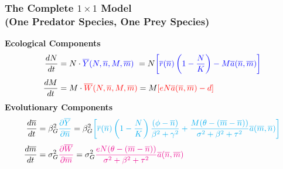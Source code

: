 \documentclass[10pt]{beamer}
\begin{document}
\begin{frame}
	\frametitle{The Complete $1\times1$ Model \\ (One Predator Species, One Prey Species)}
	{\bf Ecological Components}
	\begin{align*}
		\frac{dN}{dt} &= N\cdot {\color{blue}\overline{Y}(N, \overline{n}, M, \overline{m})}\ = N{\color{blue}\left[\overline{r}(\overline{n})\left(1 - \frac{N}{K}\right) - M\overline{a}(\overline{n}, \overline{m})\right]}\\[.1cm]
		\frac{dM}{dt} &= M\cdot {\color{red}\overline{W}(N, \overline{n}, M, \overline{m})} = M{\color{red}\left[eN\overline{a}(\overline{n}, \overline{m}) - d\right]}
	\end{align*}
	{\bf Evolutionary Components}
	\begin{align*}
		\frac{d\overline{n}}{dt} &= \beta_G^2{\color{cyan}\frac{\partial \overline{Y}}{\partial \overline{n}}} = \beta_G^2{\color{cyan}\left[\overline{r}(\overline{n})\left(1 - \frac{N}{K}\right)\frac{(\phi - \overline{n})}{\beta^2 + \gamma^2} + \frac{M(\theta - (\overline{m} - \overline{n}))}{\sigma^2 + \beta^2 + \tau^2} \overline{a}(\overline{m}, \overline{n})\right]}\\[.1cm]
		\frac{d\overline{m}}{dt} &= \sigma_G^2{\color{magenta}\frac{\partial \overline{W}}{\partial \overline{m}}} = \sigma_G^2{\color{magenta}\frac{eN(\theta - (\overline{m} - \overline{n}))}{\sigma^2 + \beta^2 + \tau^2} \overline{a}(\overline{n}, \overline{m})}
	\end{align*}
\end{frame}



\end{document}
